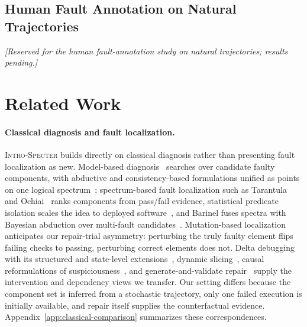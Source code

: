 \documentclass{article}
\newcommand{\method}{\textsc{Intro-Specter}\xspace}
\begin{document}
\subsection{Human Fault Annotation on Natural Trajectories}\label{sec:human-annotation}
\emph{[Reserved for the human fault-annotation study on natural trajectories; results pending.]}

\section{Related Work}\label{sec:related}

\paragraph{Classical diagnosis and fault localization.}
\method builds directly on classical diagnosis rather than presenting fault localization as new. Model-based diagnosis~\citep{reiter1987diagnosis,dekleer1987gde} searches over candidate faulty components, with abductive and consistency-based formulations unified as points on one logical spectrum~\citep{console1991spectrum}; spectrum-based fault localization such as Tarantula and Ochiai~\citep{jones2005tarantula,abreu2006ochiai,wong2016survey} ranks components from pass/fail evidence, statistical predicate isolation scales the idea to deployed software~\citep{liblit2005scalable}, and Barinel fuses spectra with Bayesian abduction over multi-fault candidates~\citep{abreu2009barinel}. Mutation-based localization~\citep{papadakis2015metallaxis,moon2014muse} anticipates our repair-trial asymmetry: perturbing the truly faulty element flips failing checks to passing, perturbing correct elements does not. Delta debugging with its structured and state-level extensions~\citep{zeller2002delta,misherghi2006hdd,cleve2005causes}, dynamic slicing~\citep{weiser1981slicing,korel1988dynslicing,agrawal1990dynslicing}, causal reformulations of suspiciousness~\citep{halpern2005causes,baah2010causal}, and generate-and-validate repair~\citep{legoues2012genprog,mechtaev2016angelix} supply the intervention and dependency views we transfer. Our setting differs because the component set is inferred from a stochastic trajectory, only one failed execution is initially available, and repair itself supplies the counterfactual evidence. Appendix~\ref{app:classical-comparison} summarizes these correspondences.
\end{document}
